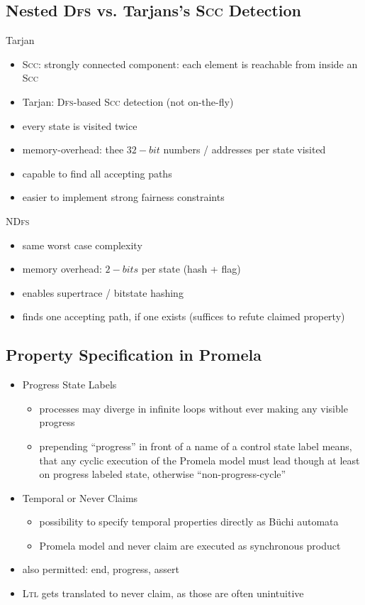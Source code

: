 \documentclass[a4paper, 10pt]{article}
\begin{document}
\subsection*{Nested \textsc{Dfs} vs. Tarjans's \textsc{Scc} Detection}
\begin{minipage}{0.48\textwidth}
Tarjan
\begin{itemize}
    \item \textsc{Scc}: strongly connected component: each element is reachable from inside an \textsc{Scc}
    \item Tarjan: \textsc{Dfs}-based \textsc{Scc} detection (not on-the-fly)
    \item every state is visited twice
    \item memory-overhead: thee $32-bit$ numbers / addresses per state visited
    \item capable to find all accepting paths
    \item easier to implement strong fairness constraints
\end{itemize}
\end{minipage}
\hfill \vrule \hfill
\begin{minipage}{0.48\textwidth}
\textsc{NDfs}
\begin{itemize}
    \item same worst case complexity
    \item memory overhead: $2-bits$ per state (hash + flag)
    \item enables supertrace / bitstate hashing
    \item finds one accepting path, if one exists (suffices to refute claimed property)
\end{itemize}
\end{minipage}
\subsection*{Property Specification in Promela}
\begin{itemize}
    \item Progress State Labels
    \begin{itemize}
        \item processes may diverge in infinite loops without ever making any visible progress
        \item prepending ``progress'' in front of a name of a control state label means, that any cyclic execution of the Promela model must lead though at least on progress labeled state, otherwise ``non-progress-cycle''
    \end{itemize}
    \item Temporal or Never Claims
    \begin{itemize}
        \item possibility to specify temporal properties directly as Büchi automata
        \item Promela model and never claim are executed as synchronous product
    \end{itemize}
    \item also permitted: end, progress, assert
    \item \textsc{Ltl} gets translated to never claim, as those are often unintuitive
\end{itemize}
\end{document}

